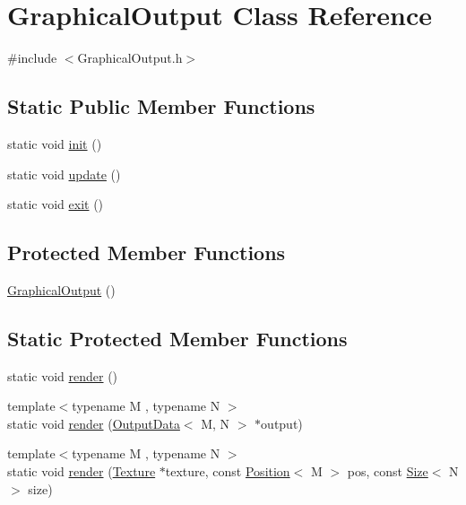 \hypertarget{class_graphical_output}{\section{Graphical\-Output Class Reference}
\label{class_graphical_output}
}


{\ttfamily \#include $<$Graphical\-Output.\-h$>$}

\subsection*{Static Public Member Functions}
\begin{DoxyCompactItemize}
\item 
static void \hyperlink{class_graphical_output_a3f59c7d791678ab879630978dba7d05b}{init} ()
\item 
static void \hyperlink{class_graphical_output_a27864dad8c7239c22178dbecb405f495}{update} ()
\item 
static void \hyperlink{class_graphical_output_a1cb8ff787dfe43095c9b28e5eb895364}{exit} ()
\end{DoxyCompactItemize}
\subsection*{Protected Member Functions}
\begin{DoxyCompactItemize}
\item 
\hyperlink{class_graphical_output_aa6fb0c39405c04d734d6255ddc95e853}{Graphical\-Output} ()
\end{DoxyCompactItemize}
\subsection*{Static Protected Member Functions}
\begin{DoxyCompactItemize}
\item 
static void \hyperlink{class_graphical_output_adeab950f26458b742cd5b4dd6becfd9a}{render} ()
\item 
{\footnotesize template$<$typename M , typename N $>$ }\\static void \hyperlink{class_graphical_output_a53fe675842428997d80272249ab2cb8d}{render} (\hyperlink{struct_output_data}{Output\-Data}$<$ M, N $>$ $\ast$output)
\item 
{\footnotesize template$<$typename M , typename N $>$ }\\static void \hyperlink{class_graphical_output_a3ff488839b978d605b3f718289056760}{render} (\hyperlink{_default_config_8h_a9ca20d8445e7d830c262f5ec4bb5d1bf}{Texture} $\ast$texture, const \hyperlink{struct_position}{Position}$<$ M $>$ pos, const \hyperlink{struct_size}{Size}$<$ N $>$ size)
\end{DoxyCompactItemize}
